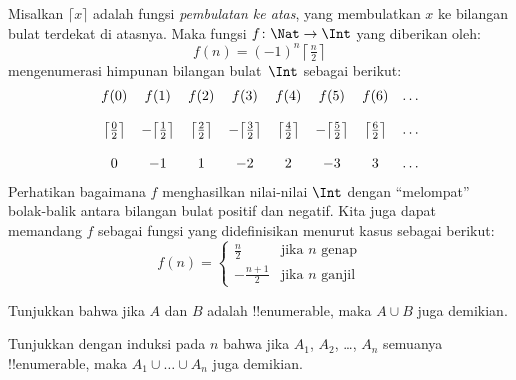 \documentclass[../../../include/open-logic-section]{subfiles}
\begin{document}
\begin{ex}
Misalkan $\lceil x \rceil$ adalah fungsi \emph{pembulatan ke atas}, yang
membulatkan $x$ ke bilangan bulat terdekat di atasnya. Maka fungsi $f \colon
\Nat \to \Int$ yang diberikan oleh:
\[
  f(n) = (-1)^{n} \left\lceil\tfrac{n}{2}\right\rceil
\]
mengenumerasi himpunan bilangan bulat~$\Int$ sebagai berikut:
\[
\begin{array}{c c c c c c c c}
f(0) & f(1) & f(2) & f(3) & f(4) & f(5) & f(6) & \dots \\ \\
\big\lceil \tfrac{0}{2} \big\rceil & -\big\lceil \tfrac{1}{2}\big\rceil &  \big\lceil \tfrac{2}{2} \big\rceil & -\big\lceil \tfrac{3}{2} \big\rceil & \big\lceil \tfrac{4}{2} \big\rceil  & -\big\lceil \tfrac{5}{2}\big\rceil & \big\lceil \tfrac{6}{2} \big\rceil & \dots \\ \\
0 & -1 & 1 & -2 & 2 & -3 & 3& \dots
\end{array}
\]
Perhatikan bagaimana $f$ menghasilkan nilai-nilai $\Int$ dengan ``melompat''
bolak-balik antara bilangan bulat positif dan negatif. Kita juga dapat
memandang $f$ sebagai fungsi yang didefinisikan menurut kasus sebagai berikut:
\[
f(n) = \begin{cases}
  \frac{n}{2} & \text{jika $n$ genap}\\
  -\frac{n+1}{2} & \text{jika $n$ ganjil}
  \end{cases}
\]
\end{ex}

\begin{prob}
Tunjukkan bahwa jika $A$ dan $B$ adalah !!{enumerable}, maka $A \cup B$ juga
demikian.
\end{prob}

\begin{prob}
Tunjukkan dengan induksi pada $n$ bahwa jika $A_1$, $A_2$, \dots, $A_n$
semuanya !!{enumerable}, maka $A_1 \cup \dots \cup A_n$ juga demikian.
\end{prob}
\end{document}
